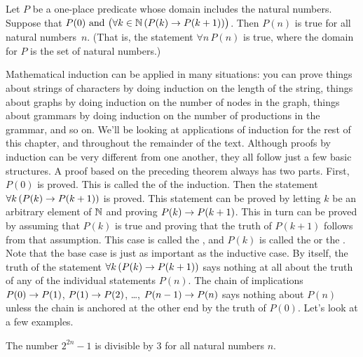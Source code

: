 \begin{theorem}
Let $P$ be a one-place predicate whose domain includes
the natural numbers.  Suppose that $P(0)\text{ and } \big(\forall k\in{\mathbb N}\,(P(k)\rightarrow P(k+1))\big)$.
Then $P(n)$ is true for all natural numbers~$n$.  (That is, 
the statement $\forall n\,P(n)$ is true, where the domain for $P$ is
the set of natural numbers.)
\end{theorem}

Mathematical induction can be applied in many situations:
you can prove things about strings of characters by doing induction on the
length of the string, things about graphs by doing induction on the
number of nodes in the graph, things about grammars by doing induction on
the number of productions in the grammar, and so on. We'll
be looking at applications of induction for the rest of this chapter,
and throughout the remainder of the text.
Although proofs by induction can be very different from one
another, they all follow just a few basic structures.  A proof based
on the preceding theorem always has two parts.  First, $P(0)$
is proved.  This is called the  of the induction.
Then the statement $\forall k\,(P(k)\rightarrow P(k+1))$ is proved.
This statement can be proved by letting $k$ be an arbitrary
element of ${\mathbb N}$ and proving $P(k)\rightarrow P(k+1)$.  This in turn can
be proved by assuming that $P(k)$ is true and proving that
the truth of $P(k+1)$ follows from that assumption.  This case is called
the , and $P(k)$ is called the  or
the .
Note that the base case is just as important
as the inductive case.  By itself, the truth of the statement $\forall k\,(P(k)\rightarrow P(k+1))$
says nothing at all about the truth of any of the individual statements $P(n)$.
The chain of implications $P(0)\rightarrow P(1)$, $P(1)\rightarrow P(2)$, \dots, 
$P(n-1)\rightarrow P(n)$ says nothing about $P(n)$ unless the chain is
anchored at the other end by the truth of $P(0)$.  Let's look
at a few examples.

\begin{theorem}
The number $2^{2n}-1$ is divisible by 3 for all natural numbers $n$.
\end{theorem}

